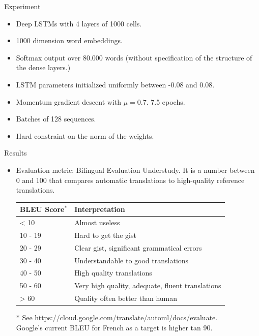 \documentclass{beamer}
\begin{document}
\begin{frame}{Experiment}
\begin{itemize}
    \item Deep LSTMs with 4 layers of 1000 cells.
    \item 1000 dimension word embeddings.
    \item Softmax output over 80.000 words (without specification of the structure of the dense layers.)
    \item LSTM parameters initialized uniformly between -0.08 and 0.08.
    \item Momentum gradient descent with $\mu=0.7$. 7.5 epochs.
    \item Batches of 128 sequences. 
    \item Hard constraint on the norm of the weights. 
\end{itemize}
\end{frame}
\begin{frame}{Results}
\begin{itemize}
    \item Evaluation metric: Bilingual Evaluation Understudy. It is a number between 0 and 100 that compares automatic translations to high-quality reference translations. 

\begin{table}[]
    \centering
    \begin{tabular}{|l|l|}
\hline
\textbf{BLEU Score$^*$} & \textbf{Interpretation}\\
\hline
< 10 &	Almost useless\\
\hline
10 - 19 &	Hard to get the gist\\
\hline
20 - 29	& Clear gist, significant grammatical errors\\
\hline
30 - 40 &	Understandable to good translations\\
\hline
40 - 50	& High quality translations\\
\hline
50 - 60 &	Very high quality, adequate, fluent translations\\
\hline
> 60 &	Quality often better than human \\
\hline
\end{tabular}
\end{table}
    \footnotesize{$*$ See https://cloud.google.com/translate/automl/docs/evaluate. \\Google's  current BLEU for French as a target is higher tan 90.\\}
\end{itemize}
    
\end{frame}
\end{document}
